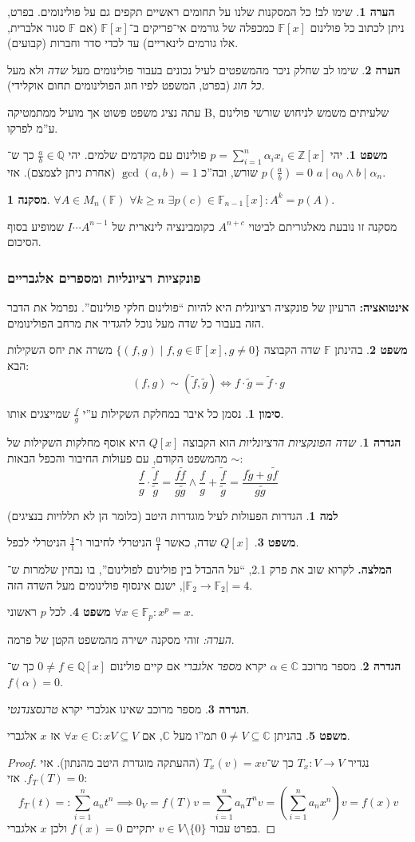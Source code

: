 \documentclass[a4paper]{article}
\newcommand\Z     {\mathbb{Z}}
\newcommand\Q     {\mathbb{Q}}
\newcommand\C     {\mathbb{C}}
\newcommand\sumnio    {\sum_{i = 1}^{n}}
\newcommand\F         {\mathbb{F}}
\newcommand\co        {\colon}
\newcommand\ag        {\alpha}
\newcommand\tl    {\tilde}
\newcommand\sof[1]    {\left | #1 \right |}
\newcommand\cl [1]    {\left ( #1 \right )}
\theoremstyle{definition}
\newtheorem{Theorem}{משפט}
\newtheorem{definition}{הגדרה}
\newtheorem{Lemma}{למה}
\newtheorem{Remark}{הערה}
\newtheorem{Notion}{סימון}
\newtheorem{Collary}{מסקנה}
\newcommand\cola [1] {\begin{Collary}#1\end{Collary}}
\newcommand\theo  [1] {\begin{Theorem}#1\end{Theorem}}
\newcommand\defi  [1] {\begin{definition}#1\end{definition}}
\newcommand\rmark [1] {\begin{Remark}#1\end{Remark}}
\newcommand\lem   [1] {\begin{Lemma}#1\end{Lemma}}
\newcommand\noti  [1] {\begin{Notion}#1\end{Notion}}
\begin{document}
	\rmark{שימו לב! כל המסקנות שלנו על תחומים ראשיים תקפים גם על פולינומים. בפרט, ניתן לכתוב כל פולינום $\F[x]$ כמכפלה של גורמים אי־פריקים ב־$\F[x]$ (אם $\F$ סגור אלברית, אלו גורמים לינאריים) עד לכדי סדר וחברות (קבועים). }
	\rmark{שימו לב שחלק ניכר מהמשפטים לעיל נכונים בעבור פולינומים מעל \textit{שדה} ולא מעל \textit{כל חוג} (בפרט, המשפט לפיו חוג הפולינומים תחום אוקלידי). }
	עתה נציג משפט פשוט אך מועיל ממתמטיקה B, שלעיתים משמש לניחוש שורשי פולינום ע''מ לפרקו. 
	\theo{יהי $p = \sumnio \ag_i x_i \in \Z[x]$ פולינום עם מקדמים שלמים. יהי $\frac{a}{b} \in \Q$ כך ש־$p\cl{\frac{a}{b}} = 0$ שורש, ובה''כ $\gcd(a, b) = 1$ (אחרת ניתן לצמצם). אזי $a \mid \ag_0 \land b \mid \ag_n$. }
	
	\cola{$\forall A \in M_n(\F) \,\, \forall k \ge n \,\, \exists p(c) \in \F_{n - 1}[x] \co A^{k} = p(A)$. }
	מסקנה זו נובעת מאלגוריתם לביטוי $A^{n + c}$ כקומבינציה לינארית של $I \cdots A^{n - 1}$ שמופיע בסוף הסיכום. 
	
	\subsubsection{פונקציות רציונליות ומספרים אלגבריים}
	\textbf{אינטואציה: }הרעיון של פונקציה רציונלית היא להיות ``פולינום חלקי פולינום''. נפרמל את הדבר הזה בעבור כל שדה מעל נוכל להגדיר את מרחב הפולינומים. 
	
	\theo{בהינתן $\F$ שדה הקבוצה $\{(f, g) \mid f, g \in \F[x], g \neq 0\}$ משרה את יחס השקילות הבא: 
	\[ (f, g) \sim (\tl f, \tl g) \iff f \cdot \tl g = \tl f \cdot g \]}
	\noti{נסמן כל איבר במחלקת השקילות ע''י $\frac{f}{g}$ שמייצגים אותו. }
	\defi{\textit{שדה הפונקציות הרציונליות} הוא הקבוצה $Q[x]$ היא אוסף מחלקות השקילות של $\sim$ מהמשפט הקודם, עם פעולות החיבור והכפל הבאות: 
	\[ \frac{f}{g} \cdot \frac{\tl f}{\tl g} = \frac{f \tl f}{g \tl g} \land \frac{f}{g} + \frac{\tl f}{\tl g} = \frac{f \tl g + g \tl f}{g \tl g} \]}
	\lem{הגדרות הפעולות לעיל מוגדרות היטב (כלומר הן לא תללויות בנציגים)}
	\theo{$Q[x]$ שדה, כאשר $\frac{0}{1}$ הניטרלי לחיבור ו־$\frac{1}{1}$ הניטרלי לכפל. }
	\textbf{המלצה. }לקרוא שוב את פרק 2.1, ``על ההבדל בין פולינום לפולינום'', בו נבחין שלמרות ש־$\sof{\F_2 \to \F_2} = 4$, ישנם אינסוף פולינומים מעל השדה הזה. 
	
	\theo{לכל $p$ ראשוני $\forall x \in \F_p \co x^{p} = x$. }
	\textit{הערה: }זוהי מסקנה ישירה מהמשפט הקטן של פרמה. 
	
	\defi{מספר מרוכב $\ag \in \C$ יקרא \textit{מספר אלגברי} אם קיים פולינום $0 \neq f \in \Q[x]$ כך ש־$f(\ag) = 0$. }
	\defi{מספר מרוכב שאינו אגלברי יקרא \textit{טרנסצנדנטי}. }
	\theo{בהניתן $0 \neq V \subseteq \C$ תמ''ו מעל $\C$, אם $\forall x \in \C\co xV \subseteq V$ אז $x$ אלגברי. }
	\begin{proof}
		נגדיר $T_x \co V \to V$ כך ש־$T_x(v) = xv$ (ההעתקה מוגדרת היטב מהנתון). אזי $f_T(T) = 0$. אזי: 
		\[ f_T(t) =: \sumnio a_nt^{n} \implies 0_V = f(T)v = \sumnio a_nT^{n}v = \cl{\sumnio a_nx^{n}}v = f(x)v \]
		בפרט עבור $v \in V \setminus \{0\}$ יתקיים $f(x) = 0$ ולכן $x$ אלגברי. 
	\end{proof}
	
\end{document}
